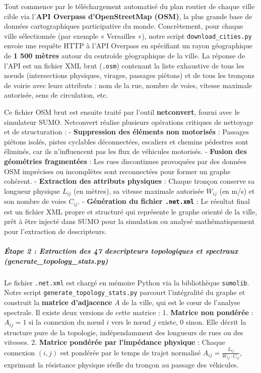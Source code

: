\documentclass[10pt, a4paper]{article}
\begin{document}
Tout commence par le téléchargement automatisé du plan routier de chaque
ville cible via l'\textbf{API Overpass d'OpenStreetMap (OSM)}, la plus
grande base de données cartographiques participative du monde.
Concrètement, pour chaque ville sélectionnée (par exemple « Versailles
»), notre script \texttt{download\_cities.py} envoie une requête HTTP à
l'API Overpass en spécifiant un rayon géographique de \textbf{1 500
mètres} autour du centroïde géographique de la ville. La réponse de
l'API est un fichier XML brut (\texttt{.osm}) contenant la liste
exhaustive de tous les nœuds (intersections physiques, virages, passages
piétons) et de tous les tronçons de voirie avec leurs attributs : nom de
la rue, nombre de voies, vitesse maximale autorisée, sens de
circulation, etc.

Ce fichier OSM brut est ensuite traité par l'outil \textbf{netconvert},
fourni avec le simulateur SUMO. Netconvert réalise plusieurs opérations
critiques de nettoyage et de structuration : - \textbf{Suppression des
éléments non motorisés} : Passages piétons isolés, pistes cyclables
déconnectées, escaliers et chemins pédestres sont éliminés, car ils
n'influencent pas les flux de véhicules motorisés. - \textbf{Fusion des
géométries fragmentées} : Les rues discontinues provoquées par des
données OSM imprécises ou incomplètes sont reconnectées pour former un
graphe cohérent. - \textbf{Extraction des attributs physiques} : Chaque
tronçon conserve sa longueur physique \(L_{ij}\) (en mètres), sa vitesse
maximale autorisée \(W_{ij}\) (en m/s) et son nombre de voies
\(C_{ij}\). - \textbf{Génération du fichier \texttt{.net.xml}} : Le
résultat final est un fichier XML propre et structuré qui représente le
graphe orienté de la ville, prêt à être injecté dans SUMO pour la
simulation ou analysé mathématiquement pour l'extraction de
descripteurs.

\subparagraph{Étape 2 : Extraction des 47 descripteurs topologiques et
spectraux
(generate\_topology\_stats.py)}\label{uxe9tape-2-extraction-des-47-descripteurs-topologiques-et-spectraux-generate_topology_stats.py}

Le fichier \texttt{.net.xml} est chargé en mémoire Python via la
bibliothèque \texttt{sumolib}. Notre script
\texttt{generate\_topology\_stats.py} parcourt l'intégralité du graphe
et construit la \textbf{matrice d'adjacence} \(A\) de la ville, qui est
le cœur de l'analyse spectrale. Il existe deux versions de cette matrice
: 1. \textbf{Matrice non pondérée} : \(A_{ij} = 1\) si la connexion du
nœud \(i\) vers le nœud \(j\) existe, \(0\) sinon. Elle décrit la
structure pure de la topologie, indépendamment des longueurs de rues ou
des vitesses. 2. \textbf{Matrice pondérée par l'impédance physique} :
Chaque connexion \((i, j)\) est pondérée par le temps de trajet
normalisé \(A_{ij} = \frac{L_{ij}}{W_{ij} \cdot C_{ij}}\), exprimant la
résistance physique réelle du tronçon au passage des véhicules.
\end{document}
